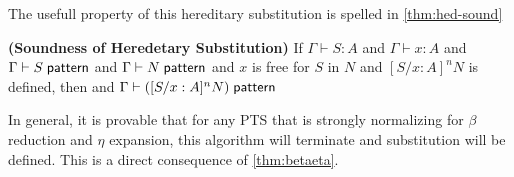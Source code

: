 The usefull property of this hereditary substitution is spelled in \ref{thm:hed-sound}

\begin{theorem}
\textbf{(Soundness of Heredetary Substitution)}
If  $\Gamma \vdash S : A$ 
and $\Gamma \vdash x : A$ 
and $\Gamma \vdash S \; \mathsf{pattern}$ 
and $\Gamma \vdash N \; \mathsf{pattern}$ 
and $x$ is free for $S$ in $N$
and $[S / x : A]^n N$ is defined, 
then
and $\Gamma \vdash ([S / x : A]^n N) \; \mathsf{pattern}$ 
\label{thm:hed-sound}
\end{theorem}

In general, it is provable that for any PTS that is strongly normalizing for $\beta$ reduction and 
$\eta$ expansion, this algorithm will terminate and substitution will be defined.  
This is a direct consequence of \ref{thm:betaeta}.

